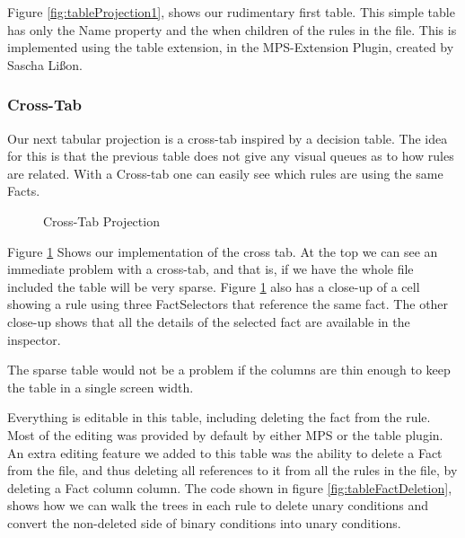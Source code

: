 Figure \ref{fig:tableProjection1}, shows our rudimentary first table.
This simple table has only the Name property and the when children of the rules in the file.
This is implemented using the table extension, in the MPS-Extension Plugin, created by Sascha Lißon.

\subsubsection{Cross-Tab}
Our next tabular projection is a cross-tab inspired by a decision table.
The idea for this is that the previous table does not give any visual queues as to how rules are related.
With a Cross-tab one can easily see which rules are using the same Facts.

\begin{figure}[h]
    \centering
    \caption{Cross-Tab Projection}
    \label{fig:crosstabProjection1}
\end{figure}

Figure \ref{fig:crosstabProjection1} Shows our implementation of the cross tab.
At the top we can see an immediate problem with a cross-tab, and that is, if we have the whole file included the table will be very sparse.
Figure \ref{fig:crosstabProjection1} also has a close-up of a cell showing a rule using three FactSelectors that reference the same fact.
The other close-up shows that all the details of the selected fact are available in the inspector.

The sparse table would not be a problem if the columns are thin enough to keep the table in a single screen width.

Everything is editable in this table, including deleting the fact from the rule.
Most of the editing was provided by default by either MPS or the table plugin.
An extra editing feature we added to this table was the ability to delete a Fact from the file, and thus deleting all references to it from all the rules in the file, by deleting a Fact column column.
The code shown in figure \ref{fig:tableFactDeletion}, shows how we can walk the trees in each rule to delete unary conditions and convert the non-deleted side of binary conditions into unary conditions.

